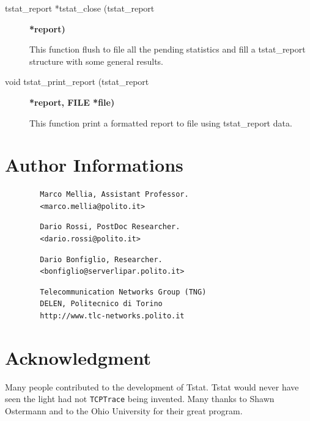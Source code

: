 \documentclass[11pt]{article}
\begin{document}
\begin{description}
\item[{tstat\_report *tstat\_close (tstat\_report}] \textbf{*report)}

This function flush to file all the pending statistics
and fill a tstat\_report structure with some general
results.


\item[{void tstat\_print\_report (tstat\_report}] \textbf{*report, FILE *file)}

This function print a formatted report to file
using tstat\_report data.

\end{description}
\section{Author Informations\label{Author_Informations}}
\begin{small}\begin{verbatim}
        Marco Mellia, Assistant Professor.
        <marco.mellia@polito.it>
\end{verbatim}\end{small} \noindent
\begin{small}\begin{verbatim}
        Dario Rossi, PostDoc Researcher.
        <dario.rossi@polito.it>
\end{verbatim}\end{small} \noindent
\begin{small}\begin{verbatim}
        Dario Bonfiglio, Researcher.
        <bonfiglio@serverlipar.polito.it>
\end{verbatim}\end{small} \noindent
\begin{small}\begin{verbatim}
        Telecommunication Networks Group (TNG)
        DELEN, Politecnico di Torino
        http://www.tlc-networks.polito.it
\end{verbatim}\end{small} \noindent
\section{Acknowledgment\label{Acknowledgment}}


Many people contributed to the development of Tstat. Tstat would never have seen
the light had not \texttt{TCPTrace} being invented.
Many thanks to Shawn Ostermann and to the  Ohio
University for their great program.
\end{document}
